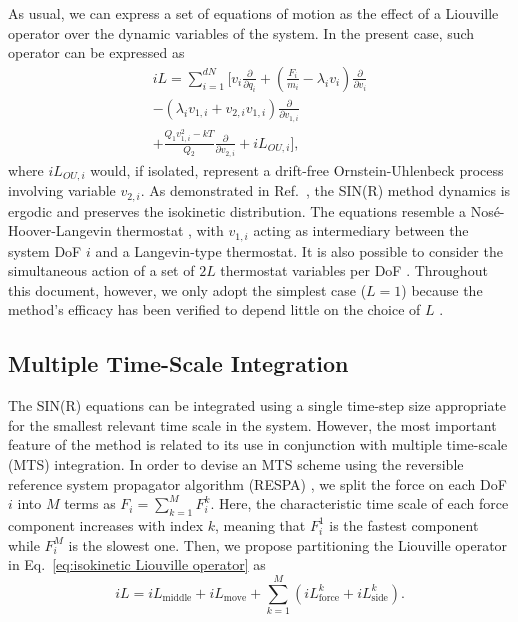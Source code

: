 \documentclass[
    journal=jctcce,
    layout=twocolumn
]{achemso}
\newcommand{\diff}[2]{\frac{\partial #2}{\partial #1}} %
\newcommand{\dof}{i}   %
\begin{document}
As usual, we can express a set of equations of motion as the effect of a Liouville operator over the dynamic variables of the system.
In the present case, such operator can be expressed as
\begin{multline}
\label{eq:isokinetic Liouville operator}
iL = \sum_{\dof=1}^{dN} \bigg[ v_\dof\diff{q_\dof}{} + \left(\frac{F_\dof}{m_\dof} - \lambda_\dof v_\dof\right)\diff{v_\dof}{} \\
- \left( \lambda_\dof v_{1,\dof} + v_{2,\dof} v_{1,\dof} \right) \diff{v_{1,\dof}}{} \\
+ \tfrac{Q_1 v_{1,\dof}^2 - kT}{Q_2}\diff{v_{2,\dof}}{}
+ iL_{OU,\dof} \bigg],
\end{multline}
where $iL_{OU,\dof}$ would, if isolated, represent a drift-free Ornstein-Uhlenbeck process involving variable $v_{2,\dof}$.
As demonstrated in Ref.~, the SIN(R) method dynamics is ergodic and preserves the isokinetic distribution.
The equations resemble a Nos\'{e}-Hoover-Langevin thermostat \cite{Samoletov_2007, Leimkuhler_2009}, with $v_{1,\dof}$ acting as intermediary between the system DoF $\dof$ and a Langevin-type thermostat.
It is also possible to consider the simultaneous action of a set of $2L$ thermostat variables per DoF \cite{Minary_2003, Minary_2003_2}.
Throughout this document, however, we only adopt the simplest case ($L=1$) because the method's efficacy has been verified to depend little on the choice of $L$ \cite{Leimkuhler_2013, Margul_2016}.

\subsection{Multiple Time-Scale Integration}

The SIN(R) equations can be integrated using a single time-step size appropriate for the smallest relevant time scale in the system.
However, the most important feature of the method is related to its use in conjunction with multiple time-scale (MTS) integration.
In order to devise an MTS scheme using the reversible reference system propagator algorithm (RESPA) \cite{Tuckerman_1992}, we split the force on each DoF $\dof$ into $M$ terms as $F_\dof = \sum_{k=1}^M F_\dof^k$.
Here, the characteristic time scale of each force component increases with index $k$, meaning that $F_\dof^1$ is the fastest component while $F_\dof^M$ is the slowest one.
Then, we propose partitioning the Liouville operator in Eq.~\eqref{eq:isokinetic Liouville operator} as
\begin{equation}
\label{eq:RESPA Liouville Operator}
iL = iL_\mathrm{middle} + iL_\mathrm{move} + \sum_{k=1}^M \left( iL_\mathrm{force}^k + iL_\mathrm{side}^k \right).
\end{equation}
\end{document}
